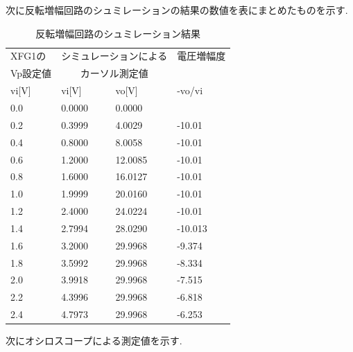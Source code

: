 \documentclass[a4j,10pt,dvipdfmx]{jarticle}
\begin{document}
次に反転増幅回路のシュミレーションの結果の数値を表にまとめたものを示す.
\begin{table}[H]
  \begin{center}
  \begin{tabular}{|l|l|l|l|}
  \hline
      XFG1の & \multicolumn{2}{|c|}{シミュレーションによる}  & 電圧増幅度 \\
      Vp設定値 & \multicolumn{2}{|c|}{カーソル測定値}  & \\ \hline
      vi[V] & vi[V] & vo[V] & -vo/vi \\ \hline
      0.0  & 0.0000 & 0.0000 &  \\ \hline
      0.2  & 0.3999 & 4.0029 & -10.01 \\ \hline
      0.4  & 0.8000 & 8.0058 & -10.01 \\ \hline
      0.6  & 1.2000 & 12.0085 & -10.01 \\ \hline
      0.8  & 1.6000 & 16.0127 & -10.01 \\ \hline
      1.0  & 1.9999 & 20.0160 & -10.01 \\ \hline
      1.2  & 2.4000 & 24.0224 & -10.01 \\ \hline
      1.4  & 2.7994 & 28.0290 & -10.013 \\ \hline
      1.6  & 3.2000 & 29.9968 & -9.374 \\ \hline
      1.8  & 3.5992 & 29.9968 & -8.334 \\ \hline
      2.0  & 3.9918 & 29.9968 & -7.515 \\ \hline
      2.2  & 4.3996 & 29.9968 & -6.818 \\ \hline
      2.4  & 4.7973 & 29.9968 & -6.253 \\ \hline
  \end{tabular}
  \caption{反転増幅回路のシュミレーション結果}
\end{center}
\end{table}
次にオシロスコープによる測定値を示す.
\end{document}
